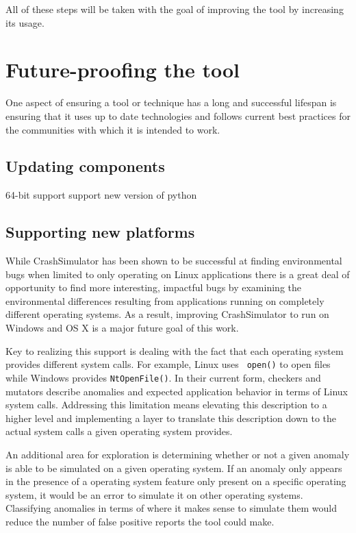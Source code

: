 \documentclass[twocolumn]{article}
\begin{document}
All of these steps will be taken with the goal of improving the tool by
increasing its usage.

\section{Future-proofing the tool}

One aspect of ensuring a tool or technique has a long and successful
lifespan is ensuring that it uses up to date technologies and follows
current best practices for the communities with which it is intended to
work.

\subsection{Updating components}
64-bit support
support new version of python

\subsection{Supporting new platforms}

While CrashSimulator has been shown to be successful at finding
environmental bugs when limited to only operating on Linux applications
there is a great deal of opportunity to find more interesting, impactful
bugs by examining the environmental differences resulting from applications
running on completely different operating systems.  As a result, improving
CrashSimulator to run on Windows and OS X is a major future goal of this
work.

Key to realizing this support is dealing with the fact that each operating
system provides different system calls.  For example, Linux uses {\tt
open()} to open files while Windows provides {\tt NtOpenFile()}.  In their
current form, checkers and mutators describe anomalies and expected
application behavior in terms of Linux system calls.  Addressing this
limitation means elevating this description to a higher level and
implementing a layer to translate this description down to the actual
system calls a given operating system provides.

An additional area for exploration is determining whether or not a given
anomaly is able to be simulated on a given operating system.  If an anomaly
only appears in the presence of a operating system feature only present on
a specific operating system, it would be an error to simulate it on other
operating systems.  Classifying anomalies in terms of where it makes sense
to simulate them would reduce the number of false positive reports the tool
could make.
\end{document}
